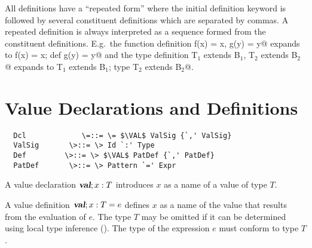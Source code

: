 \documentclass[11pt]{report}
\newcommand{\iflet}[1]{}
\begin{document}

All definitions have a ``repeated form'' where the initial
definition keyword is followed by several constituent definitions
which are separated by commas.  A repeated definition is
always interpreted as a sequence formed from the
constituent definitions. E.g.\ the function definition
\verb@def f(x) = x, g(y) = y@ expands to
\verb@def f(x) = x; def g(y) = y@ and
the type definition
\verb@type T$_1$ extends B$_1$, T$_2$ extends B$_2$@ expands to
\verb@type T$_1$ extends B$_1$; type T$_2$ extends B$_2$@.

\section{Value Declarations and Definitions}
\label{sec:valdef}

\syntax\begin{verbatim}
  Dcl             \=::= \= $\VAL$ ValSig {`,' ValSig}
  ValSig       \>::= \> Id `:' Type
  Def         \>::= \> $\VAL$ PatDef {`,' PatDef}
  PatDef       \>::= \> Pattern `=' Expr
\end{verbatim}

A value declaration $\mbox{\sl\bfseries val};x:T$ introduces $x$ as a name of a value of
type $T$.  \iflet{Values of type $T$ are formed using $\VAL$ or $\LET$
definitions.}

A value definition $\mbox{\sl\bfseries val};x: T = e$ defines $x$ as a name of the value
that results from the evaluation of $e$. The type $T$ may be omitted
if it can be determined using local type inference
().  The type of the expression $e$ must
conform to type $T$.
\end{document}
